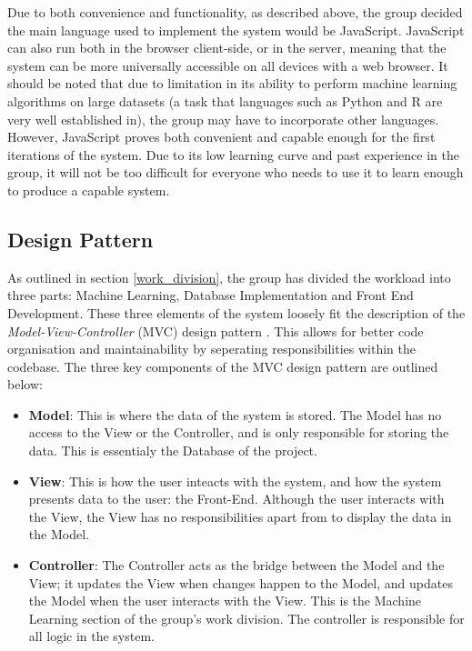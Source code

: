 \documentclass[a4paper,titlepage]{article}
\begin{document}
Due to both convenience and functionality, as described above, the group decided the main language used to implement the system would be JavaScript.
JavaScript can also run both in the browser client-side, or in the server, meaning that the system can be more universally accessible on all devices with a web browser.
It should be noted that due to limitation in its ability to perform machine learning algorithms on large datasets (a task that languages such as Python and R are very well established in), the group may have to incorporate other languages.
However, JavaScript proves both convenient and capable enough for the first iterations of the system.
Due to its low learning curve and past experience in the group, it will not be too difficult for everyone who needs to use it to learn enough to produce a capable system.

\subsection{Design Pattern}
As outlined in section \ref{work_division}, the group has divided the workload into three parts: Machine Learning, Database Implementation and Front End Development.
These three elements of the system loosely fit the description of the \textit{Model-View-Controller} (MVC) design pattern \cite{google_mvc}.
This allows for better code organisation and maintainability \cite{google_mvc} by seperating responsibilities within the codebase.
The three key components of the MVC design pattern are outlined below:
\begin{itemize}
  \item \textbf{Model}:
  This is where the data of the system is stored.
  The Model has no access to the View or the Controller, and is only responsible for storing the data.
  This is essentialy the Database of the project.
  \item \textbf{View}:
  This is how the user inteacts with the system, and how the system presents data to the user: the Front-End.
  Although the user interacts with the View, the View has no responsibilities apart from to display the data in the Model.
  \item \textbf{Controller}:
  The Controller acts as the bridge between the Model and the View; it updates the View when changes happen to the Model, and updates the Model when the user interacts with the View.
  This is the Machine Learning section of the group's work division.
  The controller is responsible for all logic in the system.
\end{itemize}
\end{document}
